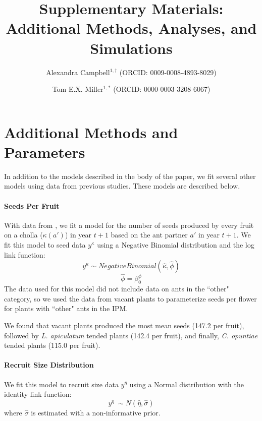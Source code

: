 \documentclass[11pt]{article}
\title{Supplementary Materials: Additional Methods, Analyses, and Simulations}
\author{
	Alexandra Campbell$^{1,\dagger}$ (ORCID: 0009-0008-4893-8029) \and
	Tom E.X. Miller$^{1,\ast}$ (ORCID: 0000-0003-3208-6067)
}
\date{}
\begin{document}
	
	\maketitle
	
	
	
	
	\appendix
	\label{appendix}
	\section{Additional Methods and Parameters} \label{appendix:A}
	\renewcommand{\thefigure}{A\arabic{figure}}
	
	In addition to the models described in the body of the paper, we fit several other models using data from previous studies.
	These models are described below.
	
	\paragraph{Seeds Per Fruit}
	With data from \cite{Miller2007}, we fit a model for the number of seeds produced by every fruit on a cholla ($\kappa(a')$) in year $t+1$ based on the ant partner $a'$ in year $t+1$.
	We fit this model to seed data $y^{\kappa}$ using a Negative Binomial distribution and the log link function: 
	$$y^{\kappa} \sim  Negative Binomial(\hat{\kappa},\hat{\phi})$$
	$$\hat{\phi} = \beta_{0}^{\phi}$$
	The data used for this model did not include data on ants in the ``other" category, so we used the data from vacant plants to parameterize seeds per flower for plants with ``other" ants in the IPM.
	
	\begin{figure}
		\caption{
		}
		\label{app:seeds}
	\end{figure}
	
	
	We found that vacant plants produced the most mean seeds (147.2 per fruit), followed by \textit{L. apiculatum} tended plants (142.4 per fruit), and finally, \textit{C. opuntiae} tended plants (115.0 per fruit).
	
	
	\paragraph{Recruit Size Distribution}
	We fit this model to recruit size data $y^{\eta}$ using a Normal distribution with the identity link function: 
	$$y^{\eta} ~\sim N(\hat{\eta},\hat{\sigma})$$
	where $\hat{\sigma}$ is estimated with a non-informative prior. 
	
\end{document}
